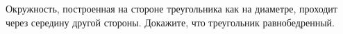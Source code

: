 \begin{ex}
	\begin{condition}
		Окружность, построенная на стороне треугольника как на диаметре, проходит через середину другой стороны. Докажите, что треугольник равнобедренный.
	\end{condition}
\end{ex}